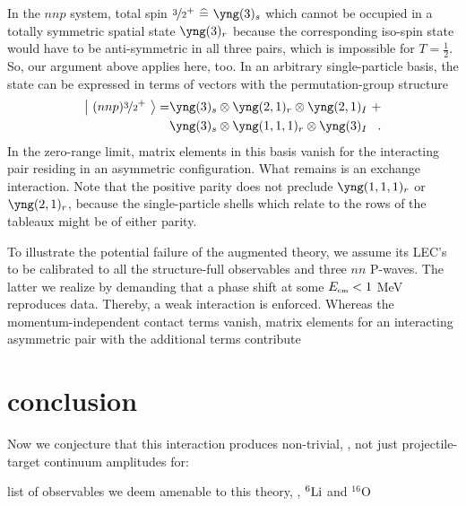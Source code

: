 \documentclass[aps,prd,twocolumn
,tightenlines,letterpaper,
nofootinbib]{revtex4-1}
\begin{document}
In the $nnp$ system, total spin $\nicefrac{3}{2}^+\ent\yng(3)_s$ which cannot be occupied in a totally
symmetric spatial state $\yng(3)_r$ because the corresponding iso-spin state would have to be anti-symmetric
in all three pairs, which is impossible for $T=\frac{1}{2}$.
So, our argument above applies here, too. In an arbitrary single-particle basis, the state can be expressed
in terms of vectors with the permutation-group structure
\begin{align}\label{eq.nnp-tripl}
    \left\vert~(nnp)\nicefrac{3}{2}^+~\right\rangle=&\yng(3)_s\otimes\yng(2,1)_r\otimes\yng(2,1)_I~+\nonumber\\
    &\yng(3)_s\otimes\yng(1,1,1)_r\otimes\yng(3)_I\;\;\;.
\end{align}
In the zero-range limit, matrix elements in this basis vanish for the interacting pair residing in an
asymmetric configuration. What remains is an exchange interaction.
Note that the positive parity does not preclude $\yng(1,1,1)_r$ or $\yng(2,1)_r$, because the single-particle
shells which relate to the rows of the tableaux might be of either parity.

To illustrate the potential failure of the augmented theory, we assume its LEC's to be calibrated
to all the structure-full observables and three $nn$ P-waves. The latter we realize by demanding that
a phase shift at some $E_\text{\tiny cm}<1~$MeV reproduces data. Thereby, a weak interaction is enforced.
Whereas the momentum-independent contact terms vanish, matrix elements for an interacting asymmetric
pair with the additional terms contribute


\section{conclusion}
Now we conjecture that this interaction produces non-trivial, \ie, not just projectile-target
continuum amplitudes for: \begin{ecce}list of observables we deem amenable to this theory, \eg, ${{}^6\text{Li}}$ and ${}^{16}$O\end{ecce} 





\newpage


\end{document}

